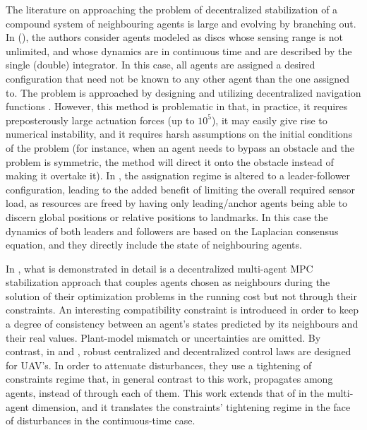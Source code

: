 The literature on approaching the problem of decentralized stabilization of a
compound system of neighbouring agents is large and evolving by branching out.
In \cite{1470732} (\cite{00207170600867123}), the authors consider agents modeled
as discs whose sensing range is not unlimited, and whose dynamics are in
continuous time and are described by the single (double) integrator. In this case,
all agents are assigned a desired configuration that need not be known to
any other agent than the one assigned to. The problem is approached by
designing and utilizing decentralized navigation functions \cite{Lav06}.
However, this method is problematic in that, in practice, it requires
preposterously large actuation forces (up to $10^5$), it may easily give rise to
numerical instability, and it requires harsh assumptions on the initial
conditions of the problem (for instance, when an agent needs to bypass an
obstacle and the problem is symmetric, the method will direct it onto the
obstacle instead of making it overtake it). In \cite{Gustavi2010133}, the
assignation regime is altered to a leader-follower configuration, leading to the
added benefit of limiting the overall required sensor load, as resources are freed
by having only leading/anchor agents being able to discern global positions or
relative positions to landmarks.  In this case the dynamics of both leaders and
followers are based on the Laplacian consensus equation, and they directly
include the state of neighbouring agents.

In \cite{Dunbar2006549}, what is demonstrated in detail is a decentralized
multi-agent MPC stabilization approach that couples agents chosen as neighbours
during the solution of their optimization problems in the running cost but not
through their constraints. An interesting compatibility constraint is introduced
in order to keep a degree of consistency between an agent's states predicted by
its neighbours and their real values. Plant-model mismatch or uncertainties are
omitted.  By contrast, in \cite{1383977} and \cite{1429425}, robust centralized
and decentralized control laws are designed for UAV's. In order to attenuate
disturbances, they use a tightening of constraints regime that, in general
contrast to this work, propagates among agents, instead of through each of them.
This work extends that of \cite{1185106} in the multi-agent dimension,
and it translates the constraints' tightening regime in the face of disturbances
in the continuous-time case. \\[0.5ex]

